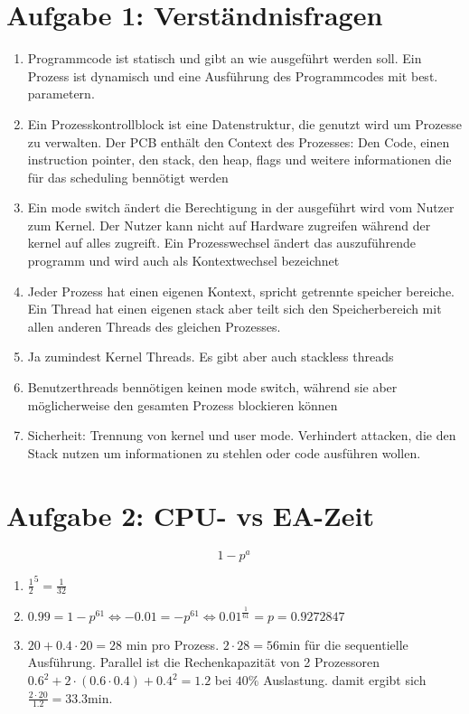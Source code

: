 \documentclass[a4paper,10pt]{article}
\begin{document}
\section*{Aufgabe 1: Verständnisfragen}
\begin{enumerate}
 \item Programmcode ist statisch und gibt an wie ausgeführt werden soll. Ein Prozess ist dynamisch und eine Ausführung des Programmcodes mit best. parametern.
 \item  Ein Prozesskontrollblock ist eine Datenstruktur, die genutzt wird um Prozesse zu verwalten. Der PCB enthält den Context des Prozesses: Den Code, einen instruction pointer, den stack, den heap, flags und weitere informationen die für das scheduling bennötigt werden
 \item Ein mode switch ändert die Berechtigung in der ausgeführt wird vom Nutzer zum Kernel. Der Nutzer kann nicht auf Hardware zugreifen während der kernel auf alles zugreift. Ein Prozesswechsel ändert das auszuführende programm und wird auch als Kontextwechsel bezeichnet
 \item Jeder Prozess hat einen eigenen Kontext, spricht getrennte speicher bereiche. Ein Thread hat einen eigenen stack aber teilt sich den Speicherbereich mit allen anderen Threads des gleichen Prozesses.
 \item Ja zumindest Kernel Threads. Es gibt aber auch stackless threads
 \item Benutzerthreads bennötigen keinen mode switch, während sie aber möglicherweise den gesamten Prozess blockieren können
 \item Sicherheit: Trennung von kernel und user mode. Verhindert attacken, die den Stack nutzen um informationen zu stehlen oder code ausführen wollen.
\end{enumerate}

\section*{Aufgabe 2: CPU- vs EA-Zeit}
\[ 1-p^a \]
\begin{enumerate}
    \item $\frac{1}{2}^5 = \frac{1}{32}$ 
    \item $0.99 = 1-p^{61} \Leftrightarrow -0.01 = -p^{61} \Leftrightarrow 0.01^{\frac{1}{61}} = p = 0.9272847$ 
    \item $20 + 0.4 \cdot 20 = 28$ min pro Prozess. $2 \cdot 28 = 56$min für die sequentielle Ausführung. Parallel ist die Rechenkapazität von 2 Prozessoren $0.6^2 + 2 \cdot (0.6\cdot0.4) + 0.4^2 = 1.2$ bei $40\%$ Auslastung. damit ergibt sich $\frac{2 \cdot 20}{1.2} = 33.3$min.
\end{enumerate}
\end{document}
